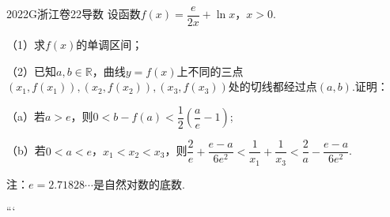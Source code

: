 
\begin{problem}{2022}{G}{浙江卷}{22}{导数}
设函数$f(x)=\dfrac{e}{2x}+\ln x$，$x>0$.

（1）求$f(x)$的单调区间；

（2）已知$a,b\in\mathbb{R}$，曲线$y=f(x)$上不同的三点$(x_1,f(x_1)),(x_2,f(x_2)),(x_3,f(x_3))$处的切线都经过点$(a,b)$.证明：

（a）若$a>e$，则$0 < b - f(a) < \dfrac{1}{2}\left(\dfrac{a}{e}-1\right)$;

（b）若$0<a<e$，$x_1<x_2<x_3$，则$\dfrac{2}{e}+\dfrac{e-a}{6e^2} < \dfrac{1}{x_1}+\dfrac{1}{x_3} < \dfrac{2}{a}-\dfrac{e-a}{6e^2}$.

注：$e=2.71828\cdots$是自然对数的底数.
\end{problem}
```